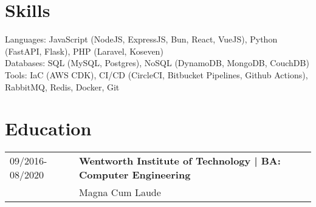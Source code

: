 \documentclass[a4paper,10pt]{article}
\begin{document}
\section*{\textcolor{blueishgray}{Skills}}
Languages: JavaScript (NodeJS, ExpressJS, Bun, React, VueJS), Python (FastAPI, Flask), PHP (Laravel, Koseven) \\
Databases: SQL (MySQL, Postgres), NoSQL (DynamoDB, MongoDB, CouchDB) \\
Tools: IaC (AWS CDK), CI/CD (CircleCI, Bitbucket Pipelines, Github Actions), RabbitMQ, Redis, Docker, Git

\section*{\textcolor{blueishgray}{Education}}
\begin{tabularx}{\linewidth}{l|>{\raggedright\arraybackslash}X}
    {\small \textcolor{datecolor}{09/2016-08/2020}} & \textbf{\textcolor{blueishgray}{Wentworth Institute of Technology} | BA: Computer Engineering} \\  & Magna Cum Laude
\end{tabularx}
\end{document}
